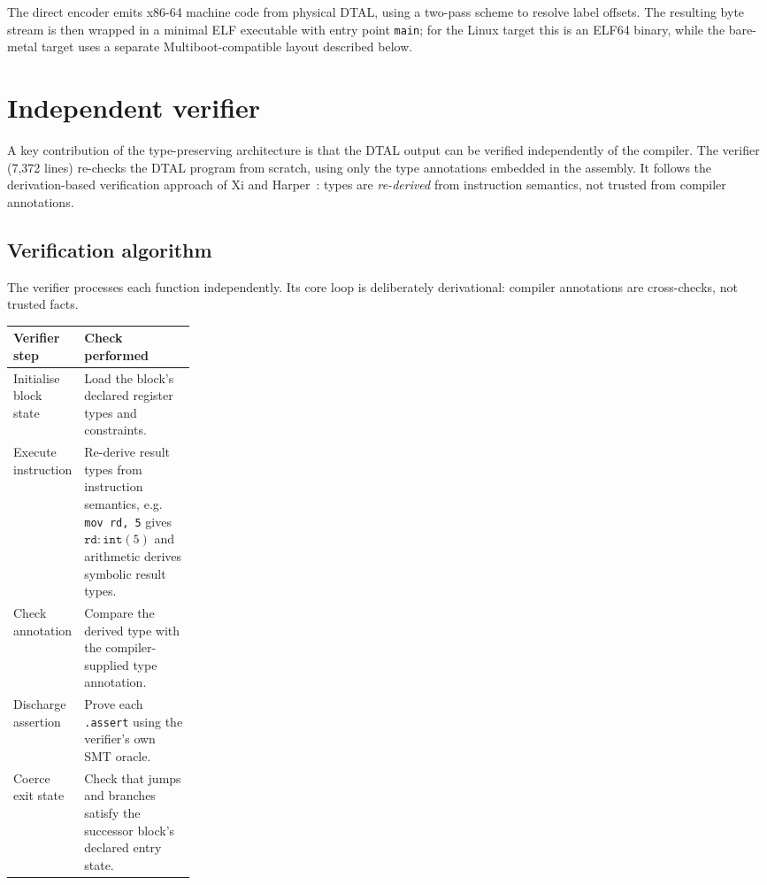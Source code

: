 The direct encoder emits x86-64 machine code from physical DTAL, using a two-pass scheme to resolve label offsets. The resulting byte stream is then wrapped in a minimal ELF executable with entry point \texttt{main}; for the Linux target this is an ELF64 binary, while the bare-metal target uses a separate Multiboot-compatible layout described below.

\section{Independent verifier}\label{sec:verifier}

A key contribution of the type-preserving architecture is that the DTAL output can be verified independently of the compiler. The verifier (7,372 lines) re-checks the DTAL program from scratch, using only the type annotations embedded in the assembly. It follows the derivation-based verification approach of Xi and Harper~\cite{Xi2001DTAL}: types are \textit{re-derived} from instruction semantics, not trusted from compiler annotations.

\subsection{Verification algorithm}

The verifier processes each function independently. Its core loop is deliberately derivational: compiler annotations are cross-checks, not trusted facts.

\begin{center}
\small
\begin{tabularx}{0.96\linewidth}{@{}p{0.24\linewidth}X@{}}
\toprule
\textbf{Verifier step} & \textbf{Check performed} \\
\midrule
Initialise block state & Load the block's declared register types and constraints. \\
Execute instruction & Re-derive result types from instruction semantics, e.g. \texttt{mov rd, 5} gives $\texttt{rd} : \mathtt{int}(5)$ and arithmetic derives symbolic result types. \\
Check annotation & Compare the derived type with the compiler-supplied type annotation. \\
Discharge assertion & Prove each \texttt{.assert} using the verifier's own SMT oracle. \\
Coerce exit state & Check that jumps and branches satisfy the successor block's declared entry state. \\
\bottomrule
\end{tabularx}
\end{center}

